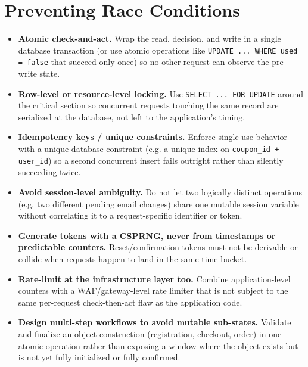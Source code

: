 \documentclass[11pt]{article}
\begin{document}
\section{Preventing Race Conditions}
\begin{itemize}[leftmargin=1.2em]
  \item \textbf{Atomic check-and-act.} Wrap the read, decision, and write in a single database transaction (or use atomic operations like \texttt{UPDATE ... WHERE used = false} that succeed only once) so no other request can observe the pre-write state.
  \item \textbf{Row-level or resource-level locking.} Use \texttt{SELECT ... FOR UPDATE} around the critical section so concurrent requests touching the same record are serialized at the database, not left to the application's timing.
  \item \textbf{Idempotency keys / unique constraints.} Enforce single-use behavior with a unique database constraint (e.g. a unique index on \texttt{coupon\_id + user\_id}) so a second concurrent insert fails outright rather than silently succeeding twice.
  \item \textbf{Avoid session-level ambiguity.} Do not let two logically distinct operations (e.g. two different pending email changes) share one mutable session variable without correlating it to a request-specific identifier or token.
  \item \textbf{Generate tokens with a CSPRNG, never from timestamps or predictable counters.} Reset/confirmation tokens must not be derivable or collide when requests happen to land in the same time bucket.
  \item \textbf{Rate-limit at the infrastructure layer too.} Combine application-level counters with a WAF/gateway-level rate limiter that is not subject to the same per-request check-then-act flaw as the application code.
  \item \textbf{Design multi-step workflows to avoid mutable sub-states.} Validate and finalize an object construction (registration, checkout, order) in one atomic operation rather than exposing a window where the object exists but is not yet fully initialized or fully confirmed.
\end{itemize}
\end{document}

